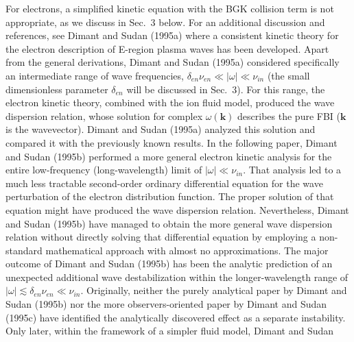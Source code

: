 \documentclass[draft]{agujournal2019}
\renewcommand{\vec}{\mathbf}
\begin{document}
{ For electrons, a simplified kinetic equation with the BGK collision term is
not appropriate, as we discuss in Sec.~3 below. For an additional discussion
and references, see Dimant and Sudan (1995a) where a consistent kinetic theory
for the electron description of E-region plasma waves has been developed.
Apart from the general derivations, Dimant and Sudan (1995a) considered
specifically an intermediate range of wave frequencies, $\delta_{en}\nu
_{en}\ll|\omega|\ll\nu_{in}$ (the small dimensionless parameter $\delta_{en}$
will be discussed in Sec.~3). For this range, the electron kinetic theory, combined 
with the ion fluid model, produced the wave dispersion relation, 
whose solution for complex $\omega(\vec{k})$ describes the pure FBI
($\vec{k}$ is the wavevector). Dimant and Sudan (1995a) analyzed this solution
and compared it with the previously known results. In the following paper, Dimant
and Sudan (1995b) performed a more general electron kinetic analysis for the
entire low-frequency (long-wavelength) limit of $|\omega|\ll\nu_{in}$. That
analysis led to a much less tractable second-order ordinary differential
equation for the wave perturbation of the electron distribution function. The
proper solution of that equation might have produced the wave dispersion
relation. Nevertheless, Dimant and Sudan (1995b) have managed to obtain the
more general wave dispersion relation without directly solving that
differential equation by employing a non-standard mathematical approach with
almost no approximations. The major outcome of Dimant and Sudan (1995b) has
been the analytic prediction of an unexpected additional wave destabilization
within the longer-wavelength range of $|\omega|\lesssim\delta_{en}\nu_{en}\ll\nu_{in}$. 
Originally, neither the purely analytical paper by Dimant and
Sudan (1995b) nor the more observers-oriented paper by Dimant and Sudan (1995c)
have identified the analytically discovered effect as a separate instability.
Only later, within the framework of a simpler fluid model, Dimant and Sudan
}
\end{document}
